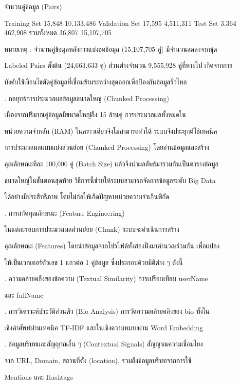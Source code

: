\documentclass[12pt,a4paper]{report}
\begin{document}
จำนวนคู่ข้อมูล (Pairs)\par
Training Set 15,848 10,133,486 Validation Set 17,595 4,511,311 Test Set 3,364 462,908 รวมทั้งหมด 36,807 15,107,705\par
หมายเหตุ : จำนวนคู่ข้อมูลหลังการแบ่งชุดข้อมูล (15,107,705 คู่) มีจำนวนลดลงจากชุด\par
Labeled Pairs ตั้งต้น (24,663,633 คู่) ส่วนต่างจำนวน 9,555,928 คู่ที่หายไป เกิดจากการ\par
บังคับใช้เงื่อนไขตัดคู่ข้อมูลที่เชื่อมข้ามระหว่างชุดออกเพื่อป้องกันข้อมูลรั่วไหล\par
{}. กลยุทธ์การประมวลผลข้อมูลขนาดใหญ่ (Chunked Processing)\par
เนื่องจากปริมาณคู่ข้อมูลมีขนาดใหญ่ถึง 15 ล้านคู่ การประมวลผลทั้งหมดใน\par
หน่วยความจำหลัก (RAM) ในคราวเดียวจึงไม่สามารถทำได้ ระบบจึงประยุกต์ใช้เทคนิค\par
การประมวลผลแบบแบ่งส่วนย่อย (Chunked Processing) โดยอ่านข้อมูลและสร้าง\par
คุณลักษณะทีละ 100,000 คู่ (Batch Size) แล้วจึงนำผลลัพธ์มารวมกันเป็นตารางข้อมูล\par
ขนาดใหญ่ในขั้นตอนสุดท้าย วิธีการนี้ช่วยให้ระบบสามารถจัดการข้อมูลระดับ Big Data\par
ได้อย่างมีประสิทธิภาพ โดยไม่ก่อให้เกิดปัญหาหน่วยความจำเกินพิกัด\par
{}. การสกัดคุณลักษณะ (Feature Engineering)\par
\clearpage
ในแต่ละรอบการประมวลผลส่วนย่อย (Chunk) ระบบจะดำเนินการสร้าง\par
คุณลักษณะ (Features) โดยนำข้อมูลจากโปรไฟล์ทั้งสองฝั่งมาคำนวณร่วมกัน เพื่อแปลง\par
ให้เป็นเวกเตอร์ตัวเลข 1 แถวต่อ 1 คู่ข้อมูล ซึ่งประกอบด้วยมิติต่าง ๆ ดังนี้\par
{}. ความคล้ายคลึงของข้อความ (Textual Similarity) การเปรียบเทียบ userName\par
และ fullName\par
{}. การวิเคราะห์ประวัติส่วนตัว (Bio Analysis) การวัดความคล้ายคลึงของ bio ทั้งใน\par
เชิงคำศัพท์ผ่านเทคนิค TF-IDF และในเชิงความหมายผ่าน Word Embedding\par
{}. ข้อมูลบริบทและสัญญาณอื่น ๆ (Contextual Signals) สัญญาณความเชื่อมโยง\par
จาก URL, Domain, สถานที่ตั้ง (location), รวมถึงข้อมูลบริบทจากการใช้\par
Mentions และ Hashtags\par
\end{document}
